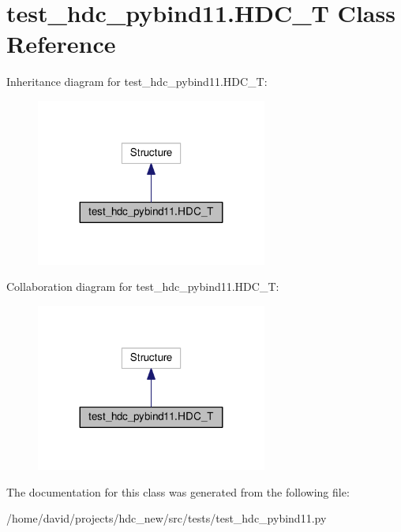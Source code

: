 \hypertarget{classtest__hdc__pybind11_1_1_h_d_c___t}{}\section{test\+\_\+hdc\+\_\+pybind11.\+H\+D\+C\+\_\+T Class Reference}
\label{classtest__hdc__pybind11_1_1_h_d_c___t}


Inheritance diagram for test\+\_\+hdc\+\_\+pybind11.\+H\+D\+C\+\_\+T\+:\nopagebreak
\begin{figure}[H]
\begin{center}
\leavevmode
\includegraphics[width=215pt]{classtest__hdc__pybind11_1_1_h_d_c___t__inherit__graph}
\end{center}
\end{figure}


Collaboration diagram for test\+\_\+hdc\+\_\+pybind11.\+H\+D\+C\+\_\+T\+:\nopagebreak
\begin{figure}[H]
\begin{center}
\leavevmode
\includegraphics[width=215pt]{classtest__hdc__pybind11_1_1_h_d_c___t__coll__graph}
\end{center}
\end{figure}


The documentation for this class was generated from the following file\+:\begin{DoxyCompactItemize}
\item 
/home/david/projects/hdc\+\_\+new/src/tests/test\+\_\+hdc\+\_\+pybind11.\+py\end{DoxyCompactItemize}
